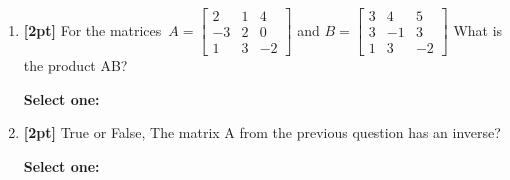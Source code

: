 \documentclass[12pt]{article}
\renewcommand{\circle}{\tikz\draw[black] (0,0) circle (1ex);}
\begin{document}
\begin{enumerate}
\clearpage
    \item \textbf{[2pt]} For the matrices $A=\begin{bmatrix} 2 & 1 & 4 \\ -3 & 2 & 0 \\ 1 & 3 & -2 \end{bmatrix} $ and $B=\begin{bmatrix} 3 & 4 & 5 \\ 3 & -1 & 3 \\ 1 & 3 & -2 \end{bmatrix}$
What is the product AB?

    \textbf{Select one:}


    \item \textbf{[2pt]} True or False, The matrix A from the previous question has an inverse?

    \textbf{Select one:}


    \clearpage
\end{enumerate}
\end{document}
